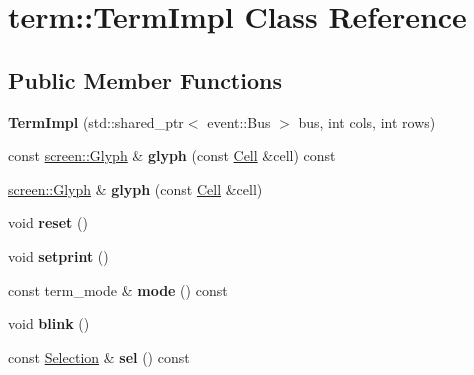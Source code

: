 \hypertarget{classterm_1_1TermImpl}{}\section{term\+::Term\+Impl Class Reference}
\label{classterm_1_1TermImpl}
\subsection*{Public Member Functions}
\begin{DoxyCompactItemize}
\item 
\mbox{\label{classterm_1_1TermImpl_a79fc364ba79f28198d4d1fb6dafe6b4e}} 
{\bfseries Term\+Impl} (std\+::shared\+\_\+ptr$<$ event\+::\+Bus $>$ bus, int cols, int rows)
\item 
\mbox{\label{classterm_1_1TermImpl_ad7a5604ebcb7d11a7ef4d5a5ffab121d}} 
const \mbox{\hyperlink{structscreen_1_1Glyph}{screen\+::\+Glyph}} \& {\bfseries glyph} (const \mbox{\hyperlink{structCell}{Cell}} \&cell) const
\item 
\mbox{\label{classterm_1_1TermImpl_a61d4159e349cfc25269fec4212cbd54f}} 
\mbox{\hyperlink{structscreen_1_1Glyph}{screen\+::\+Glyph}} \& {\bfseries glyph} (const \mbox{\hyperlink{structCell}{Cell}} \&cell)
\item 
\mbox{\label{classterm_1_1TermImpl_ab061914de857be46d790e3b5d6843e10}} 
void {\bfseries reset} ()
\item 
\mbox{\label{classterm_1_1TermImpl_acc4513a99e212cccc001312d47646456}} 
void {\bfseries setprint} ()
\item 
\mbox{\label{classterm_1_1TermImpl_abff11f008f05cf164095d8f1abb607e3}} 
const term\+\_\+mode \& {\bfseries mode} () const
\item 
\mbox{\label{classterm_1_1TermImpl_acdabe902d812780624855aea25a67095}} 
void {\bfseries blink} ()
\item 
\mbox{\label{classterm_1_1TermImpl_adba4aff1c50384c51985af6e45c62eaa}} 
const \mbox{\hyperlink{classSelection}{Selection}} \& {\bfseries sel} () const

\end{DoxyCompactItemize}
